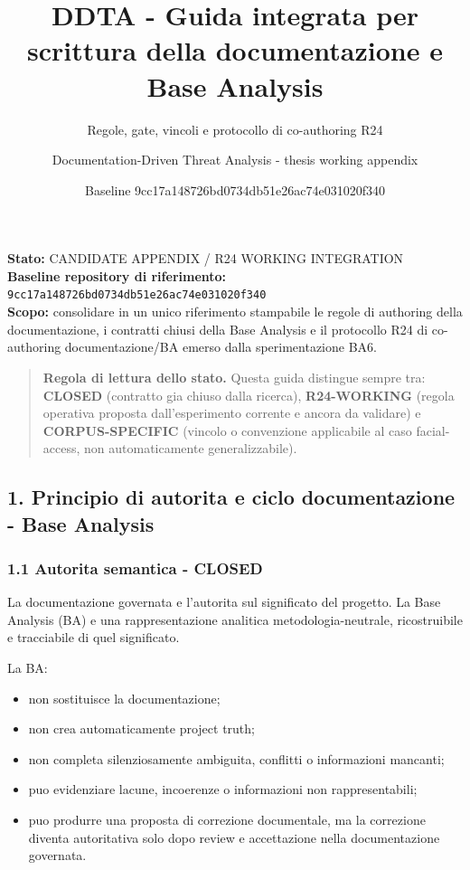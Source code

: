 \documentclass[
  9pt,
  a4paper,
]{article}
\title{DDTA - Guida integrata per scrittura della documentazione e Base
Analysis}
\subtitle{Regole, gate, vincoli e protocollo di co-authoring R24}
\author{Documentation-Driven Threat Analysis - thesis working appendix}
\date{Baseline 9cc17a148726bd0734db51e26ac74e031020f340}
\providecommand{\tightlist}{%
  \setlength{\itemsep}{0pt}\setlength{\parskip}{0pt}}
\begin{document}
\maketitle

{
\hypersetup{linkcolor=}
\setcounter{tocdepth}{3}
\tableofcontents
}
\textbf{Stato:} CANDIDATE APPENDIX / R24 WORKING INTEGRATION\\
\textbf{Baseline repository di riferimento:}
\texttt{9cc17a148726bd0734db51e26ac74e031020f340}\\
\textbf{Scopo:} consolidare in un unico riferimento stampabile le regole
di authoring della documentazione, i contratti chiusi della Base
Analysis e il protocollo R24 di co-authoring documentazione/BA emerso
dalla sperimentazione BA6.

\begin{quote}
\textbf{Regola di lettura dello stato.} Questa guida distingue sempre
tra: \textbf{CLOSED} (contratto gia chiuso dalla ricerca),
\textbf{R24-WORKING} (regola operativa proposta dall'esperimento
corrente e ancora da validare) e \textbf{CORPUS-SPECIFIC} (vincolo o
convenzione applicabile al caso facial-access, non automaticamente
generalizzabile).
\end{quote}

\subsection{1. Principio di autorita e ciclo documentazione - Base
Analysis}\label{principio-di-autorita-e-ciclo-documentazione---base-analysis}

\subsubsection{1.1 Autorita semantica -
CLOSED}\label{autorita-semantica---closed}

La documentazione governata e l'autorita sul significato del progetto.
La Base Analysis (BA) e una rappresentazione analitica
metodologia-neutrale, ricostruibile e tracciabile di quel significato.

La BA:

\begin{itemize}
\tightlist
\item
  non sostituisce la documentazione;
\item
  non crea automaticamente project truth;
\item
  non completa silenziosamente ambiguita, conflitti o informazioni
  mancanti;
\item
  puo evidenziare lacune, incoerenze o informazioni non rappresentabili;
\item
  puo produrre una proposta di correzione documentale, ma la correzione
  diventa autoritativa solo dopo review e accettazione nella
  documentazione governata.
\end{itemize}
\end{document}
